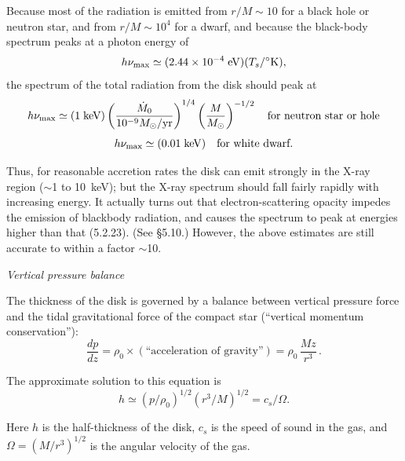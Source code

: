 Because most of the radiation is emitted from $r/M \sim 10$ for a black hole or
neutron star, and from $r/M \sim 10^4$ for a dwarf, and because the black-body
spectrum peaks at a photon energy of
\begin{equation}
h\nu_{\max} \simeq (2.44 \times 10^{-4}\;\text{eV})(T_s/{}^{\circ}\text{K}),
\notag
\end{equation}
the spectrum of the total radiation from the disk should peak at
\begin{equation}
h\nu_{\max} \simeq (1\;\text{keV})
\left(\frac{\dot{M}_0}{10^{-9} M_\odot/\text{yr}}\right)^{1/4}
\left(\frac{M}{M_\odot}\right)^{-1/2}
\quad \text{for neutron star or hole}
\notag
\end{equation}
\begin{equation}
h\nu_{\max} \simeq (0.01\;\text{keV})
\quad \text{for white dwarf.}
\notag
\end{equation}

Thus, for reasonable accretion rates the disk can emit strongly in the X-ray
region ($\sim$1 to 10~keV); but the X-ray spectrum should fall fairly rapidly with
increasing energy. It actually turns out that electron-scattering opacity impedes
the emission of blackbody radiation, and causes the spectrum to peak at energies
higher than that (5.2.23). (See \S5.10.) However, the above estimates are still
accurate to within a factor $\sim$10.


\textit{Vertical pressure balance}

The thickness of the disk is governed by a balance between vertical pressure force
and the tidal gravitational force of the compact star (``vertical momentum
conservation''):
\begin{equation}
\frac{dp}{dz} = \rho_0 \times \left(\text{``acceleration of gravity''}\right) = \rho_0\,\frac{Mz}{r^3}\,.
\tag{5.2.24}
\end{equation}

The approximate solution to this equation is
\begin{equation}
h \simeq (p/\rho_0)^{1/2}(r^3/M)^{1/2} = c_s/\Omega.
\tag{5.2.25}
\end{equation}

Here $h$ is the half-thickness of the disk, $c_s$ is the speed of sound in the gas, and
$\Omega = (M/r^3)^{1/2}$ is the angular velocity of the gas.
